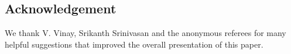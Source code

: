 \documentclass[11pt]{article}
\begin{document}
\subsection*{Acknowledgement}

We thank V. Vinay, Srikanth Srinivasan and the anonymous referees for
many helpful suggestions that improved the overall presentation of
this paper.


\end{document}
